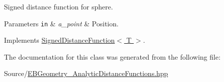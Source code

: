 Signed distance function for sphere. 


\begin{DoxyParams}[1]{Parameters}
\mbox{\tt in}  & {\em a\+\_\+point} & Position. \\
\hline
\end{DoxyParams}


Implements \hyperlink{classSignedDistanceFunction_af5912280ca51dc21a2d6949a30ec7d21}{Signed\+Distance\+Function$<$ T $>$}.



The documentation for this class was generated from the following file\+:\begin{DoxyCompactItemize}
\item 
Source/\hyperlink{EBGeometry__AnalyticDistanceFunctions_8hpp}{E\+B\+Geometry\+\_\+\+Analytic\+Distance\+Functions.\+hpp}\end{DoxyCompactItemize}
